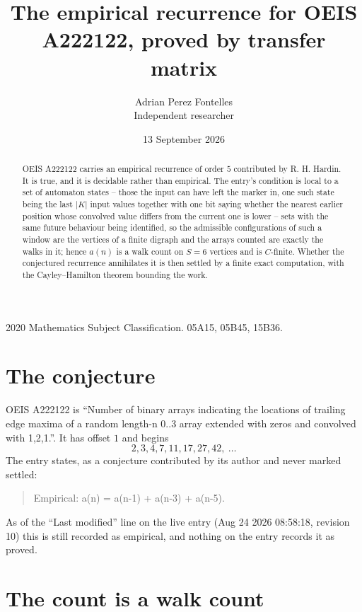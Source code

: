 \documentclass[11pt,a4paper]{article}
\title{The empirical recurrence for OEIS A222122, proved by transfer matrix}
\author{Adrian Perez Fontelles\\ \small Independent researcher}
\date{13 September 2026}
\theoremstyle{plain}
\theoremstyle{definition}
\begin{document}
\maketitle

\begin{abstract}
OEIS A222122 carries an empirical recurrence of order $5$ contributed by R. H. Hardin. It is
true, and it is decidable rather than empirical. The entry's condition is local to a set of automaton states -- those the input can have left the marker in, one such state being the last $|K|$ input values together with one bit saying whether the nearest earlier position whose convolved value differs from the current one is lower -- sets with the same future behaviour being identified, so
the admissible configurations of such a window are the vertices of a finite digraph and the
arrays counted are exactly the walks in it; hence $a(n)$ is a walk count on $S=6$ vertices
and is $C$-finite. Whether the conjectured recurrence annihilates it is then settled by a
finite exact computation, with the Cayley--Hamilton theorem bounding the work.
\end{abstract}

\noindent\small 2020 Mathematics Subject Classification. 05A15, 05B45, 15B36.\normalsize

\section{The conjecture}

OEIS A222122 is ``Number of binary arrays indicating the locations of trailing edge maxima of a random length-n 0..3 array extended with zeros and convolved with 1,2,1.''. It has offset $1$ and begins
\[
2, 3, 4, 7, 11, 17, 27, 42,\ \dots
\]
The entry states, as a conjecture contributed by its author and never marked settled:
\begin{quote}
Empirical: a(n) = a(n-1) + a(n-3) + a(n-5).
\end{quote}
As of the ``Last modified'' line on the live entry (Aug 24 2026 08:58:18, revision 10) this is still
recorded as empirical, and nothing on the entry records it as proved.

\section{The count is a walk count}
\end{document}
